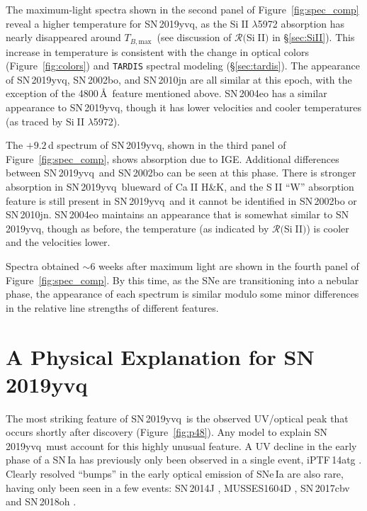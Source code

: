\documentclass[twocolumn]{aastex63}
\def\ion#1#2{#1$\;${\footnotesize\rm{#2}}\relax}
\newcommand{\tbmax}{$T_{B,\mathrm{max}}$}
\newcommand{\RSiII}{$\mathcal{R}($\ion{Si}{II}$)$}
\newcommand{\sn}{SN\,2019yvq}
\begin{document}
The maximum-light spectra shown in the second panel of
Figure~\ref{fig:spec_comp} reveal a higher temperature for \sn, as the
\ion{Si}{II} $\lambda$5972 absorption has nearly disappeared around
\tbmax\ (see discussion of $\mathcal{R}($\ion{Si}{II}$)$ in \S\ref{sec:SiII}).
This increase in temperature is consistent with the change in optical colors
(Figure~\ref{fig:colors}) and \texttt{TARDIS} spectral modeling
(\S\ref{sec:tardis}). The appearance of \sn, SN\,2002bo, and SN\,2010jn are
all similar at this epoch, with the exception of the 4800\,\AA\ feature
mentioned above. SN\,2004eo has a similar appearance to \sn, though it has
lower velocities and cooler temperatures (as traced by \ion{Si}{II}
$\lambda$5972).

The $+9.2$\,d spectrum of \sn, shown in the third panel of
Figure~\ref{fig:spec_comp}, shows absorption due to IGE. Additional
differences between \sn\ and SN\,2002bo can be seen at this phase. There is
stronger absorption in \sn\ blueward of \ion{Ca}{II} H\&K, and the \ion{S}{II}
``W'' absorption feature is still present in \sn\ and it cannot be identified
in SN\,2002bo or SN\,2010jn. SN\,2004eo maintains an appearance that is
somewhat similar to \sn, though as before, the temperature (as indicated by
\RSiII) is cooler and the velocities lower.

Spectra obtained $\sim$6 weeks after maximum light are shown in the fourth
panel of Figure~\ref{fig:spec_comp}. By this time, as the SNe are
transitioning into a nebular phase, the appearance of each spectrum is similar
modulo some minor differences in the relative line strengths of different
features.

\section{A Physical Explanation for \sn}\label{sec:models}

The most striking feature of \sn\ is the observed UV/optical peak that occurs
shortly after discovery (Figure~\ref{fig:p48}). Any model to explain \sn\ must
account for this highly unusual feature. A UV decline in the early phase of a
SN\,Ia has previously only been observed in a single event, iPTF\,14atg
\citep{Cao15}. Clearly resolved ``bumps'' in the early optical emission of
SNe\,Ia are also rare, having only been seen in a few events: SN\,2014J
\citep{Goobar15}, MUSSES1604D \citep{Jiang17}, SN\,2017cbv
\citep{Hosseinzadeh17} and SN\,2018oh \citep{Shappee19,Dimitriadis19}.
\end{document}

